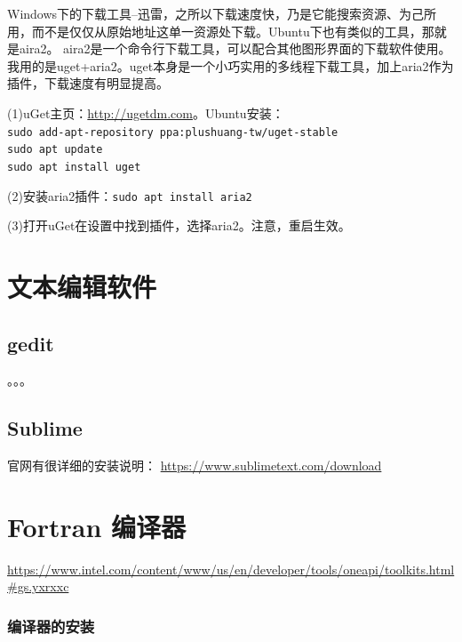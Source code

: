 Windows下的下载工具--迅雷，之所以下载速度快，乃是它能搜索资源、为己所用，而不是仅仅从原始地址这单一资源处下载。Ubuntu下也有类似的工具，那就是aira2。
aira2是一个命令行下载工具，可以配合其他图形界面的下载软件使用。我用的是uget+aria2。uget本身是一个小巧实用的多线程下载工具，加上aria2作为插件，下载速度有明显提高。

(1)uGet主页：\url{http://ugetdm.com}。Ubuntu安装：\\
\verb|sudo add-apt-repository ppa:plushuang-tw/uget-stable|\\
\verb|sudo apt update|\\
\verb|sudo apt install uget|

(2)安装aria2插件：\verb|sudo apt install aria2|

(3)打开uGet在设置中找到插件，选择aria2。注意，重启生效。





\section{文本编辑软件}
\subsection{gedit}
。。。


\subsection{Sublime}
官网有很详细的安装说明：
\url{https://www.sublimetext.com/download}










\newpage
\section{Fortran 编译器}
\url{https://www.intel.com/content/www/us/en/developer/tools/oneapi/toolkits.html#gs.yxrxxc}


\subsubsection{编译器的安装}

